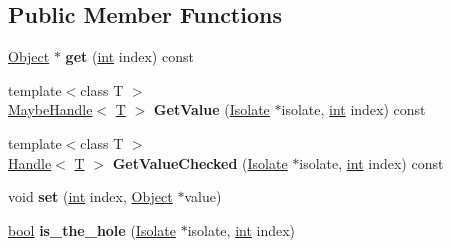 \subsection*{Public Member Functions}
\begin{DoxyCompactItemize}
\item 
\mbox{\label{classv8_1_1internal_1_1FixedArray_a9d4bb1311e3a770fb9183a2fdd276202}} 
\mbox{\hyperlink{classv8_1_1internal_1_1Object}{Object}} $\ast$ {\bfseries get} (\mbox{\hyperlink{classint}{int}} index) const
\item 
\mbox{\label{classv8_1_1internal_1_1FixedArray_a48a47ad399fbac3c50390276f6d0d821}} 
{\footnotesize template$<$class T $>$ }\\\mbox{\hyperlink{classv8_1_1internal_1_1MaybeHandle}{Maybe\+Handle}}$<$ \mbox{\hyperlink{classv8_1_1internal_1_1torque_1_1T}{T}} $>$ {\bfseries Get\+Value} (\mbox{\hyperlink{classv8_1_1internal_1_1Isolate}{Isolate}} $\ast$isolate, \mbox{\hyperlink{classint}{int}} index) const
\item 
\mbox{\label{classv8_1_1internal_1_1FixedArray_aafd41d99e13a482379d3359d6b9f106d}} 
{\footnotesize template$<$class T $>$ }\\\mbox{\hyperlink{classv8_1_1internal_1_1Handle}{Handle}}$<$ \mbox{\hyperlink{classv8_1_1internal_1_1torque_1_1T}{T}} $>$ {\bfseries Get\+Value\+Checked} (\mbox{\hyperlink{classv8_1_1internal_1_1Isolate}{Isolate}} $\ast$isolate, \mbox{\hyperlink{classint}{int}} index) const
\item 
\mbox{\label{classv8_1_1internal_1_1FixedArray_aafab6314d4f31024b9251909d1d88291}} 
void {\bfseries set} (\mbox{\hyperlink{classint}{int}} index, \mbox{\hyperlink{classv8_1_1internal_1_1Object}{Object}} $\ast$value)
\item 
\mbox{\label{classv8_1_1internal_1_1FixedArray_af53a24f01b828f3f7cf0b8e25fef91a0}} 
\mbox{\hyperlink{classbool}{bool}} {\bfseries is\+\_\+the\+\_\+hole} (\mbox{\hyperlink{classv8_1_1internal_1_1Isolate}{Isolate}} $\ast$isolate, \mbox{\hyperlink{classint}{int}} index)
\item 
\mbox{\label{classv8_1_1internal_1_1FixedArray_a1f4a2f6b84a9bf25b46f7a9239e5442b}} 

\end{DoxyCompactItemize}
